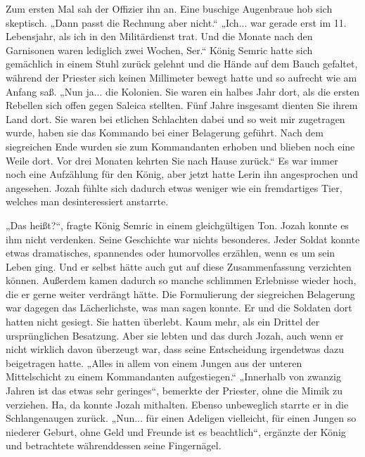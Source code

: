 Zum ersten Mal sah der Offizier ihn an. Eine buschige Augenbraue hob sich skeptisch. „Dann passt die 
Rechnung aber nicht.“
„Ich... war gerade erst im 11. Lebensjahr, als ich in den Militärdienst trat. Und die Monate nach 
den Garnisonen waren lediglich zwei Wochen, Ser.“
König Semric hatte sich gemächlich in einem Stuhl zurück gelehnt und die Hände auf dem Bauch 
gefaltet, während der Priester sich keinen Millimeter bewegt hatte und so aufrecht wie am Anfang 
saß. 
„Nun ja... die Kolonien. Sie waren ein halbes Jahr dort, als die ersten Rebellen sich offen gegen 
Saleica stellten. Fünf Jahre insgesamt dienten Sie ihrem Land dort. Sie waren bei etlichen 
Schlachten dabei und so weit mir zugetragen wurde, haben sie das Kommando bei einer Belagerung 
geführt. Nach dem siegreichen Ende wurden sie zum Kommandanten erhoben und blieben noch eine Weile 
dort. Vor drei Monaten kehrten Sie nach Hause zurück.“
Es war immer noch eine Aufzählung für den König, aber jetzt hatte Lerin ihn angesprochen und 
angesehen. Jozah fühlte sich dadurch etwas weniger wie ein fremdartiges Tier, welches man 
desinteressiert anstarrte. 

„Das heißt?“, fragte König Semric in einem gleichgültigen Ton. Jozah konnte es ihm nicht verdenken. 
Seine Geschichte war nichts besonderes. Jeder Soldat konnte etwas dramatisches, spannendes oder 
humorvolles erzählen, wenn es um sein Leben ging. Und er selbst hätte auch gut auf diese 
Zusammenfassung verzichten können. Außerdem kamen dadurch so manche schlimmen Erlebnisse wieder 
hoch, die er gerne weiter verdrängt hätte. Die Formulierung der siegreichen Belagerung war dagegen 
das Lächerlichste, was man sagen konnte. Er und die Soldaten dort hatten nicht gesiegt. Sie hatten 
überlebt. Kaum mehr, als ein Drittel der ursprünglichen Besatzung. Aber sie lebten und das durch 
Jozah, auch wenn er nicht wirklich davon überzeugt war, dass seine Entscheidung irgendetwas dazu 
beigetragen hatte.
„Alles in allem von einem Jungen aus der unteren Mittelschicht zu einem Kommandanten aufgestiegen.“
„Innerhalb von zwanzig Jahren ist das etwas sehr geringes“, bemerkte der Priester, ohne die Mimik zu 
verziehen. Ha, da konnte Jozah mithalten. Ebenso unbeweglich starrte er in die Schlangenaugen 
zurück. 
„Nun... für einen Adeligen vielleicht, für einen Jungen so niederer Geburt, ohne Geld und Freunde 
ist es beachtlich“, ergänzte der König und betrachtete währenddessen seine Fingernägel.


